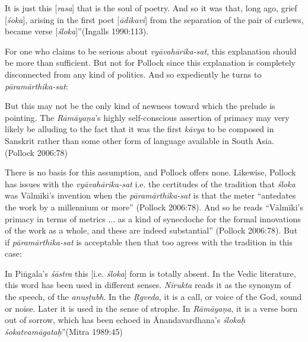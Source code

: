 \newpage

\begin{myquote}
It is just this [\textsl{rasa}] that is the soul of poetry. And so it was that, long ago, grief [\textsl{śoka}], arising in the first poet [\textsl{ādikavi}] from the separation of the pair of curlews, became verse [\textsl{śloka}]''\hfill (Ingalls 1990:113). 
\end{myquote}

For one who claims to be serious about \textsl{vyāvahārika-sat}, this explanation should be more than sufficient. But not for Pollock since this explanation is completely disconnected from any kind of politics. And so expediently he turns to \textsl{pāramārthika-sat}:  
\vskip 1pt

\begin{myquote}
But this may not be the only kind of newness toward which the prelude is pointing. The \textsl{Rāmāyaṇa}'s highly self-conscious assertion of primacy may very likely be alluding to the fact that it was the first \textsl{kāvya} to be composed in Sanskrit rather than some other form of language available in South Asia. 
\hfill (Pollock 2006:78)
\end{myquote}
\vskip 1pt

There is no basis for this assumption, and Pollock offers none. Likewise, Pollock has issues with the \textsl{vyāvahārika-sat} i.e. the certitudes of the tradition that \textsl{śloka} was Vālmīki's invention when the \textsl{pāramārthika-sat} is that the meter ``antedates the work by a millennium or more'' (Pollock 2006:78). And so he reads ``Vālmīki’s primacy in terms of metrics ... as a kind of synecdoche for the formal innovations of the work as a whole, and these are indeed substantial” (Pollock 2006:78). But if \textsl{pāramārthika-sat} is acceptable then that too agrees with the tradition in this case:
\vskip 1pt

\begin{myquote}
In Piṅgala's \textsl{śāstra} this [i.e. \textsl{śloka}] form is totally absent. In the Vedic literature, this word has been used in different senses. \textsl{Nirukta} reads it as the synonym of the speech, of the \textsl{anuṣṭubh}. In the \textsl{Ṛgveda}, it is a call, or voice of the God, sound or noise. Later it is used in the sense of strophe. In \textsl{Rāmāyaṇa}, it is a verse born out of sorrow, which has been echoed in Ānandavardhana's \textsl{ślokaḥ śokatvamāgataḥ}''\hfill (Mitra 1989:45)
\end{myquote}
\vskip 1pt


